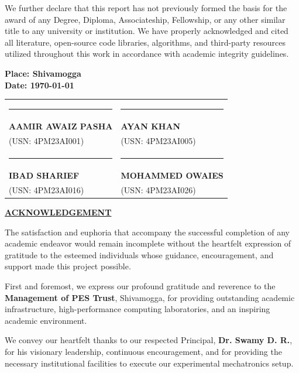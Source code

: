 \noindent We further declare that this report has not previously formed the basis for the award of any Degree, Diploma, Associateship, Fellowship, or any other similar title to any university or institution. We have properly acknowledged and cited all literature, open-source code libraries, algorithms, and third-party resources utilized throughout this work in accordance with academic integrity guidelines.

\vspace{1.2cm}
\noindent
\textbf{Place: Shivamogga}\\
\textbf{Date: \today}

\vspace{0.8cm}
\noindent
\begin{tabular}{ll}
    \rule{5.8cm}{0.4pt} & \rule{5.8cm}{0.4pt} \\
    \textbf{AAMIR AWAIZ PASHA} & \textbf{AYAN KHAN} \\
    (USN: 4PM23AI001) & (USN: 4PM23AI005) \\[1.2cm]
    \rule{5.8cm}{0.4pt} & \rule{5.8cm}{0.4pt} \\
    \textbf{IBAD SHARIEF} & \textbf{MOHAMMED OWAIES} \\
    (USN: 4PM23AI016) & (USN: 4PM23AI026) \\
\end{tabular}

\newpage
\thispagestyle{frontmatterstyle}
\begin{center}
    {\Large \textbf{\underline{ACKNOWLEDGEMENT}}}\\[0.6cm]
\end{center}

\noindent The satisfaction and euphoria that accompany the successful completion of any academic endeavor would remain incomplete without the heartfelt expression of gratitude to the esteemed individuals whose guidance, encouragement, and support made this project possible.

\noindent First and foremost, we express our profound gratitude and reverence to the \textbf{Management of PES Trust}, Shivamogga, for providing outstanding academic infrastructure, high-performance computing laboratories, and an inspiring academic environment.

\noindent We convey our heartfelt thanks to our respected Principal, \textbf{Dr. Swamy D. R.}, for his visionary leadership, continuous encouragement, and for providing the necessary institutional facilities to execute our experimental mechatronics setup.


